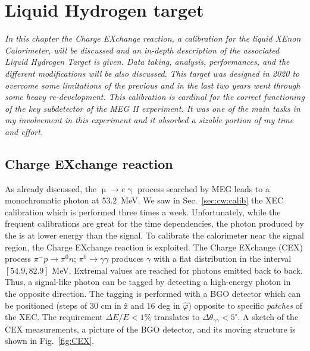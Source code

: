 \chapter{Liquid Hydrogen target}
\label{ch:MEG:CEX}
\begin{refsection}
{\itshape In this chapter the Charge EXchange reaction, a calibration for the liquid XEnon Calorimeter, will be discussed and an in-depth description of the associated Liquid Hydrogen Target is given. 
Data taking, analysis, performances, and the different modifications will be also discussed.
This target was designed in 2020 to overcome some limitations of the previous and in the last two years went through some heavy re-development.
This calibration is cardinal for the correct functioning of the key subdetector of the MEG II experiment. It  was one of the main tasks in my involvement in this experiment and it absorbed a sizable portion of my time and effort.}

\section{Charge EXchange reaction}
    As already discussed, the $\upmu \rightarrow e\upgamma$ process searched by MEG leads to a monochromatic photon at \SI{53.2}{MeV}.
    We saw in Sec.~\ref{sec:cw:calib} the XEC calibration which is performed three times a week. 
    Unfortunately, while the frequent calibrations are great for the time dependencies, the photon produced by the  is at lower energy than the signal.
    To calibrate the calorimeter near the signal region, the Charge EXchange reaction is exploited.
    The Charge EXchange (CEX) process $\pi^-p\rightarrow \pi^0n$; $\pi^0\rightarrow\gamma\gamma$ produces $\gamma$ with a flat distribution in the interval $[54.9,82.9]$ MeV.
    Extremal values are reached for photons emitted back to back. Thus, a signal-like photon can be tagged by detecting a high-energy photon in the opposite direction.
    The tagging is performed with a BGO detector which can be positioned (steps of 30 cm in \^{z} and 16 deg in $\hat{\varphi}$) opposite to specific \textit{patches} of the XEC.
    The requirement $\Delta E/E< 1\%$ translates to $\Delta \theta_{\gamma\gamma}<5^\circ$.
    A sketch of the CEX measurements, a picture of the BGO detector, and its moving structure is shown in Fig.~\ref{fig:CEX}.


\end{refsection}
